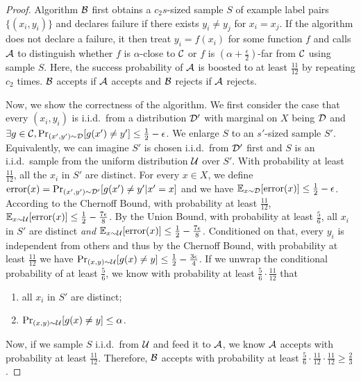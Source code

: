 \begin{proof}
Algorithm ${\mathcal B}$ first obtains a $c_2s$-sized sample $S$ of example label pairs $\{(x_i,y_i)\}$ and declares failure if there exists $y_i\neq y_j$ for $x_i=x_j$. If the algorithm does not declare a failure, it then treat $y_i=f(x_i)$ for some function $f$ and calls ${\mathcal{A}}$ to distinguish whether $f$ is $\alpha$-close to ${\mathcal{C}}$ or $f$ is $(\alpha+\frac\epsilon 2)$-far from ${\mathcal{C}}$ using sample $S$. Here, the success probability of ${\mathcal{A}}$ is boosted to at least $\frac{11}{12}$ by repeating $c_2$ times. ${\mathcal B}$ accepts if ${\mathcal{A}}$ accepts and ${\mathcal B}$ rejects if ${\mathcal{A}}$ rejects.


Now, we show the correctness of the algorithm. We first consider the case that every $(x_i,y_i)$ is i.i.d.\ from a distribution ${\mathcal{D}}'$ with marginal on $X$ being ${\mathcal{D}}$ and $\exists g\in{\mathcal{C}},\Pr_{(x',y')\sim{\mathcal{D}}}[g(x')\neq y']\leq\frac 12-\epsilon$. We enlarge $S$ to an $s'$-sized sample $S'$. Equivalently, we can imagine $S'$ is chosen i.i.d.\ from ${\mathcal{D}}'$ first and $S$ is an i.i.d.\ sample from the uniform distribution ${\mathcal{U}}$ over $S'$. With probability at least $\frac {11}{12}$, all the $x_i$ in $S'$ are distinct. For every $x\in X$, we define ${\mathrm{error}}(x)=\Pr_{(x',y')\sim{\mathcal{D}}'}[g(x')\neq y'|x'=x]$ and we have $\mathbb E_{x\sim{\mathcal{D}}}[{\mathrm{error}}(x)]\leq\frac 12-\epsilon$. According to the Chernoff Bound, with probability at least $\frac{11}{12}$, $\mathbb E_{x\sim {\mathcal{U}}}[{\mathrm{error}}(x)]\leq\frac 12-\frac {7\epsilon}8$. By the Union Bound, with probability at least $\frac 56$, all $x_i$ in $S'$ are distinct \emph{and} $\mathbb E_{x\sim {\mathcal{U}}}[{\mathrm{error}}(x)]\leq\frac 12-\frac {7\epsilon}8$. Conditioned on that, every $y_i$ is independent from others and thus by the Chernoff Bound, with probability at least $\frac {11}{12}$ we have $\Pr_{(x,y)\sim {\mathcal{U}}}[g(x)\neq y]\leq\frac 12-\frac {3\epsilon}4$. If we unwrap the conditional probability of at least $\frac 56$, we know with probability at least $\frac 56\cdot\frac{11}{12}$ that 
\begin{enumerate}
\item all $x_i$ in $S'$ are distinct;
\item $\Pr_{(x,y)\sim {\mathcal{U}}}[g(x)\neq y]\leq\alpha$.
\end{enumerate}
Now, if we sample $S$ i.i.d.\ from ${\mathcal{U}}$ and feed it to ${\mathcal{A}}$, we know ${\mathcal{A}}$ accepts with probability at least $\frac{11}{12}$. Therefore, ${\mathcal B}$ accepts with probability at least $\frac{5}{6}\cdot\frac{11}{12}\cdot\frac{11}{12}\geq \frac 23$.


\end{proof}
